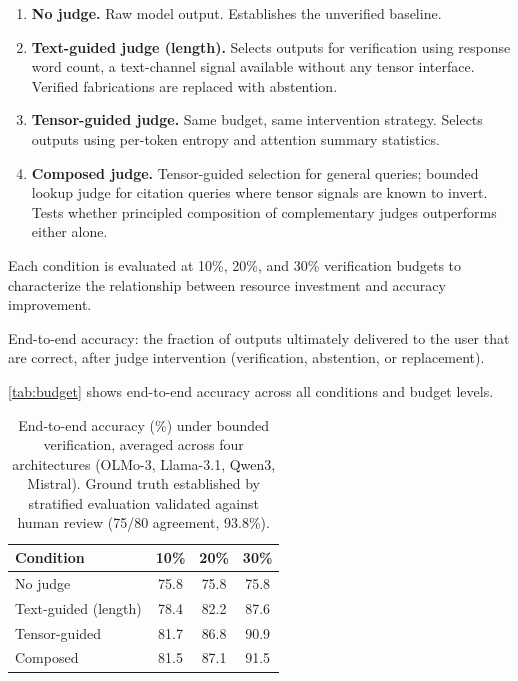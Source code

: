 \begin{enumerate}
\item \textbf{No judge.} Raw model output. Establishes the unverified baseline.
\item \textbf{Text-guided judge (length).} Selects outputs for verification
  using response word count, a text-channel signal available without any
  tensor interface. Verified fabrications are replaced with abstention.
\item \textbf{Tensor-guided judge.} Same budget, same intervention strategy.
  Selects outputs using per-token entropy and attention summary statistics.
\item \textbf{Composed judge.} Tensor-guided selection for general queries;
  bounded lookup judge for citation queries where tensor signals are known to
  invert. Tests whether principled composition of complementary judges
  outperforms either alone.
\end{enumerate}

Each condition is evaluated at 10\%, 20\%, and 30\% verification budgets to
characterize the relationship between resource investment and accuracy
improvement.

End-to-end accuracy: the fraction of outputs ultimately delivered to the user
that are correct, after judge intervention (verification, abstention, or
replacement).

\autoref{tab:budget} shows end-to-end accuracy across all conditions and budget
levels.

\begin{table}[t]
\centering
\caption{End-to-end accuracy (\%) under bounded verification, averaged across
four architectures (OLMo-3, Llama-3.1, Qwen3, Mistral). Ground truth
established by stratified evaluation validated against human review (75/80
agreement, 93.8\%).}
\label{tab:budget}
\begin{tabular}{lccc}
\toprule
\textbf{Condition} & \textbf{10\%} & \textbf{20\%} & \textbf{30\%} \\
\midrule
No judge       & 75.8 & 75.8 & 75.8 \\
Text-guided (length) & 78.4 & 82.2 & 87.6 \\
Tensor-guided  & 81.7 & 86.8 & 90.9 \\
Composed       & 81.5 & 87.1 & 91.5 \\
\bottomrule
\end{tabular}
\end{table}

